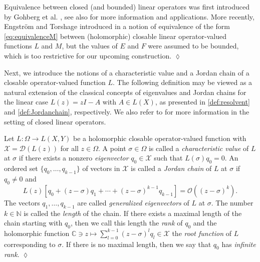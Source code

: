 \documentclass[english]{myarticle}
\begin{document}
\begin{sloppypar}
\begin{remark} \label{remark:equivalencetypes}
Equivalence between closed (and bounded) linear operators was first introduced by Gohberg et al. \cite{Gohberg1978}, see also \cite{Gohberg1990,Kaashoek2022} for more information and applications. More recently, Engstr\"om and Torshage introduced in \cite{Engstroem2017} a notion of equivalence of the form \eqref{eq:equivalenceM} between (holomorphic) closable linear operator-valued functions $L$ and $M$, but the values of $E$ and $F$ were assumed to be bounded, which is too restrictive for our upcoming construction. \hfill $\lozenge$
\end{remark}

Next, we introduce the notions of a characteristic value and a Jordan chain of a closable operator-valued function $L$. The following definition may be viewed as a natural extension of the classical concepts of eigenvalues and Jordan chains for the linear case $L(z)=zI-A$ with $A\in L(X)$, as presented in \cref{def:resolvent} and \cref{def:Jordanchain}, respectively. We also refer to \cite[Section I.1.2]{Kaashoek1992} for more information in the setting of closed linear operators.

\begin{definition} \label{def:Jordanchain2}
Let $L : \Omega \to L(X,Y)$ be a holomorphic closable operator-valued function with $\mathcal{X} = \mathcal{D}(L(z))$ for all $z \in \Omega$. A point $\sigma \in \Omega$ is called a \emph{characteristic value} of $L$ at $\sigma$ if there exists a nonzero \emph{eigenvector} $q_0 \in \mathcal{X}$ such that $L(\sigma)q_0 = 0$. An ordered set $\{q_0,\dots,q_{k-1}\}$ of vectors in $\mathcal{X}$ is called a \emph{Jordan chain} of $L$ at $\sigma$ if $q_0 \neq 0$ and
\begin{equation*}
    L(z)[q_0 + (z-\sigma)q_1 + \cdots + (z-\sigma)^{k-1}q_{k-1}] = \mathcal{O}((z-\sigma)^k).
\end{equation*}
The vectors $q_1,\dots,q_{k-1}$ are called \emph{generalized eigenvectors} of $L$ at $\sigma$. The number $k \in \mathbb{N}$ is called the \emph{length} of the chain. If there exists a maximal length of the chain starting with $q_0$, then we call this length the \emph{rank} of $q_0$ and the holomorphic function $\mathbb{C} \ni z \mapsto \sum_{l=0}^{k-1}(z-\sigma)^l q_l \in \mathcal{X}$ the \emph{root function} of $L$ corresponding to $\sigma$. If there is no maximal length, then we say that $q_0$ has \emph{infinite rank}. \hfill $\lozenge$
\end{definition}


\end{sloppypar}
\end{document}

